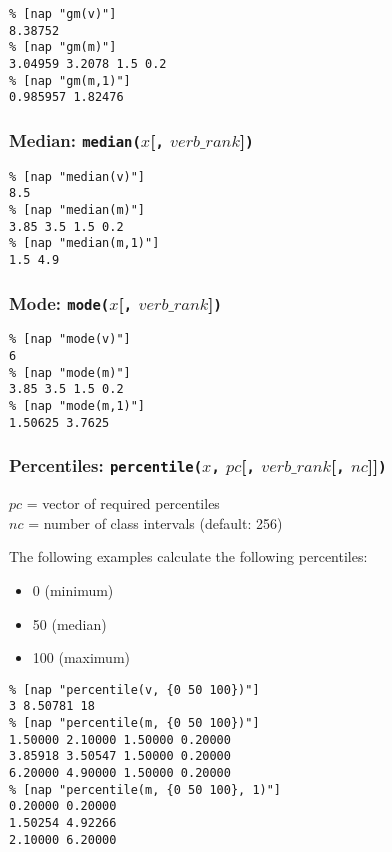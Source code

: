   \begin{verbatim}
% [nap "gm(v)"]
8.38752
% [nap "gm(m)"]
3.04959 3.2078 1.5 0.2
% [nap "gm(m,1)"]
0.985957 1.82476
\end{verbatim}

  \subsubsection{
    \label{median}Median: \texttt{median(}$x$[\texttt{,} $verb\_rank$]\texttt{)}
  }

  \begin{verbatim}
% [nap "median(v)"]
8.5
% [nap "median(m)"]
3.85 3.5 1.5 0.2
% [nap "median(m,1)"]
1.5 4.9
\end{verbatim}

  \subsubsection{
    \label{mode}Mode: \texttt{mode(}$x$[\texttt{,} $verb\_rank$]\texttt{)}
  }

  \begin{verbatim}
% [nap "mode(v)"]
6
% [nap "mode(m)"]
3.85 3.5 1.5 0.2
% [nap "mode(m,1)"]
1.50625 3.7625
\end{verbatim}

  \subsubsection{
    \label{percentile}Percentiles: \texttt{percentile(}$x$\texttt{,} $pc$[\texttt{,} $verb\_rank$[\texttt{,} $nc$]]\texttt{)}
  }

  


  $pc$ = vector of required percentiles
  \\
  $nc$ = number of class intervals (default: 256)
  

The following examples calculate the following percentiles:
  \begin{itemize}
    \item 0 (minimum)
    \item 50 (median)
    \item 100 (maximum)
  \end{itemize}
  \begin{verbatim}
% [nap "percentile(v, {0 50 100})"]
3 8.50781 18
% [nap "percentile(m, {0 50 100})"]
1.50000 2.10000 1.50000 0.20000
3.85918 3.50547 1.50000 0.20000
6.20000 4.90000 1.50000 0.20000
% [nap "percentile(m, {0 50 100}, 1)"]
0.20000 0.20000
1.50254 4.92266
2.10000 6.20000
\end{verbatim}


